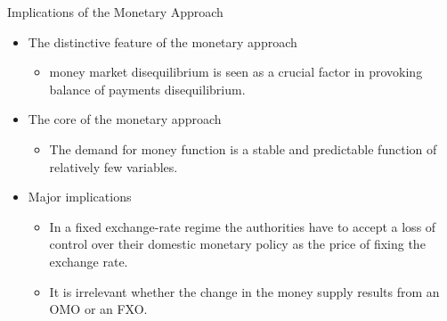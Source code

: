 \documentclass[10pt,hyperref={CJKbookmarks=true},xcolor=dvipsnames,aspectratio=169]{beamer}
\begin{document}
\begin{frame}{Implications of the Monetary Approach}

\begin{itemize}
\item The distinctive feature of the monetary approach

\begin{itemize}
\item money market disequilibrium is seen as a crucial factor in provoking
balance of payments disequilibrium. 
\end{itemize}
\item The core of the monetary approach

\begin{itemize}
\item The demand for money function is a stable and predictable function
of relatively few variables. 
\end{itemize}
\item Major implications

\begin{itemize}
\item In a fixed exchange-rate regime the authorities have to accept a loss
of control over their domestic monetary policy as the price of fixing
the exchange rate. 
\item It is irrelevant whether the change in the money supply results from
an OMO or an FXO.
\end{itemize}
\end{itemize}
\end{frame}
\end{document}
